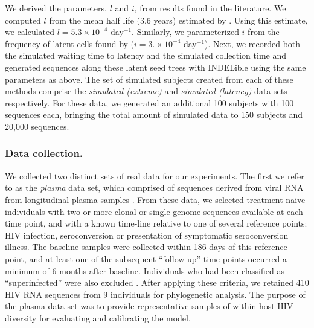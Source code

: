 \documentclass[12pt]{article}
\begin{document}
We derived the parameters, $l$ and $i$, from results found in the literature.
We computed $l$ from the mean half life ($3.6$ years) estimated by \cite{Crooks15}.
Using this estimate, we calculated $l = 5.3 \times 10^{-4}$ day$^{-1}$.
Similarly, we parameterized $i$ from the frequency of latent cells found by \cite{Ho13} ($i = 3. \times 10^{-4}$ day$^{-1}$).
Next, we recorded both the simulated waiting time to latency and the simulated collection time and generated sequences along these latent seed trees with INDELible using the same parameters as above.
The set of simulated subjects created from each of these methods comprise the \emph{simulated (extreme)} and \emph{simulated (latency)} data sets respectively.
For these data, we generated an additional 100 subjects with 100 sequences each, bringing the total amount of simulated data to 150 subjects and 20,000 sequences.


\subsubsection * {Data collection.} \label{subsec:dcollection} %
We collected two distinct sets of real data for our experiments. 
The first we refer to as the {\em plasma} data set, which comprised of sequences derived from viral RNA from longitudinal plasma samples \cite{McCloskey14}. 
From these data, we selected treatment naive individuals with two or more clonal or single-genome sequences available at each time point, and with a known time-line relative to one of several reference points: HIV infection, seroconversion or presentation of symptomatic seroconversion illness. 
The baseline samples were collected within 186 days of this reference point, and at least one of the subsequent ``follow-up'' time points occurred a minimum of 6 months after baseline.
Individuals who had been classified as ``superinfected'' were also excluded \cite{McCloskey14}.
After applying these criteria, we retained 410 HIV RNA sequences from 9 individuals for phylogenetic analysis.
The purpose of the plasma data set was to provide representative samples of within-host HIV diversity for evaluating and calibrating the model.
\end{document}
